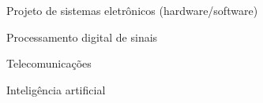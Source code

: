 

\begin{cvinterests}

  \cvinterest
    {Projeto de sistemas eletrônicos (hardware/software)} %

  \cvinterest
    {Processamento digital de sinais} %

  \cvinterest
    {Telecomunicações} %

  \cvinterest
    {Inteligência artificial} %

\end{cvinterests}
